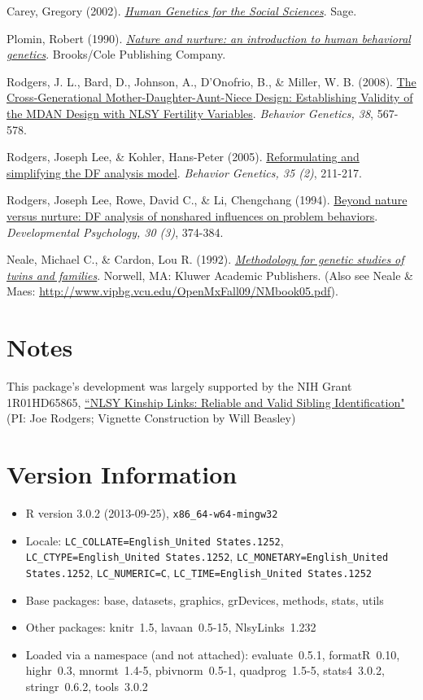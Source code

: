\documentclass{article}\usepackage[]{graphicx}\usepackage[]{color}
\begin{document}
Carey, Gregory (2002). \href{http://psych.colorado.edu/~carey/hgss/}{\emph{Human Genetics for the Social Sciences}}. Sage.

Plomin, Robert (1990). \href{http://books.google.com/books?id=r7AgAQAAIAAJ&source=gbs_navlinks_s}{\emph{Nature and nurture: an introduction to human behavioral genetics}}.  Brooks/Cole Publishing Company.

Rodgers, J. L., Bard, D., Johnson, A., D'Onofrio, B., \& Miller, W. B. (2008). \href{http://www.ncbi.nlm.nih.gov/pubmed/18825497}{The Cross-Generational Mother-Daughter-Aunt-Niece Design: Establishing Validity of the MDAN Design with NLSY Fertility Variables}. \emph{Behavior Genetics, 38}, 567-578.

Rodgers, Joseph Lee, \& Kohler, Hans-Peter (2005). \href{http://www.springerlink.com/content/n3x1v1q282583366}{Reformulating and simplifying the DF analysis model}. \emph{Behavior Genetics, 35 (2)}, 211-217.

Rodgers, Joseph Lee, Rowe, David C., \& Li, Chengchang (1994). \href{http://psycnet.apa.org/journals/dev/30/3/374/}{Beyond nature versus nurture: DF analysis of nonshared influences on problem behaviors}. \emph{Developmental Psychology, 30 (3)}, 374-384. 

Neale, Michael C., \& Cardon, Lou R. (1992). \href{http://books.google.com/books/about/Methodology_for_genetic_studies_of_twins.html?id=vVzDmDv6WDkC}{\emph{Methodology for genetic studies of twins and families}}. Norwell, MA: Kluwer Academic Publishers. (Also see Neale \& Maes: \url{http://www.vipbg.vcu.edu/OpenMxFall09/NMbook05.pdf}).
 
\section{Notes}
This package's development was largely supported by the NIH Grant 1R01HD65865, \href{http://taggs.hhs.gov/AwardDetail.cfm?s_Award_Num=R01HD065865&n_Prog_Office_Code=50}{``NLSY Kinship Links: Reliable and Valid Sibling Identification"} (PI: Joe Rodgers; Vignette Construction by Will Beasley)

\section{Version Information}
\begin{itemize}\raggedright
  \item R version 3.0.2 (2013-09-25), \verb|x86_64-w64-mingw32|
  \item Locale: \verb|LC_COLLATE=English_United States.1252|, \verb|LC_CTYPE=English_United States.1252|, \verb|LC_MONETARY=English_United States.1252|, \verb|LC_NUMERIC=C|, \verb|LC_TIME=English_United States.1252|
  \item Base packages: base, datasets, graphics, grDevices, methods, stats,
    utils
  \item Other packages: knitr~1.5, lavaan~0.5-15, NlsyLinks~1.232
  \item Loaded via a namespace (and not attached): evaluate~0.5.1,
    formatR~0.10, highr~0.3, mnormt~1.4-5, pbivnorm~0.5-1, quadprog~1.5-5,
    stats4~3.0.2, stringr~0.6.2, tools~3.0.2
\end{itemize}



\end{document}
